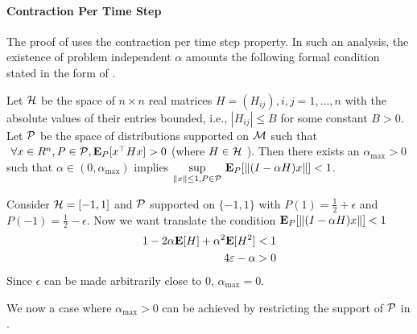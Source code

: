 \paragraph{Contraction Per Time Step}
The proof of  uses the contraction per time step property. In such an analysis, the existence of problem independent $\alpha$ amounts the following formal condition stated in the form of .
\begin{lemma}\label{steptheorem}
Let $\H$ be the space of $n\times n$ real matrices $H=(H_{ij}),i,j=1,\ldots,n$ with the absolute values of their entries bounded, i.e., $|H_{ij}|\leq B$ for some constant $B>0$. Let $\P$ be the space of distributions supported on $\M$ such that $~\forall x\in R^n, P\in \P,\E_{P}[x^\top H x] >0$ (where $H\in\H$ ). Then there exists an $\alpha_{\max}>0$ such that $\alpha\in(0,\alpha_{\max})$ implies $\us{\sup}{\norm{x}\leq 1,P\in\P}\E_{P}[\norm{(I-\alpha H)x}]< 1$.
\end{lemma}
\begin{example}
Consider $\H=[-1,1]$ and $\P$ supported on $\{-1,1\}$ with $P(1)=\frac{1}{2}+\epsilon$ and $P(-1)=\frac{1}{2}-\epsilon$. Now we want translate the condition $\E_{P}[\norm{(I-\alpha H)x}]<1$
\begin{align}
\begin{split}
1-2\alpha\E[H]+\alpha^2 \E[H^2]<1\\
4\epsilon-\alpha>0\\
\end{split}
\end{align}
Since $\epsilon$ can be made arbitrarily close to $0$, $\alpha_{\max}=0$.
\end{example}
We now a case where $\alpha_{\max}>0$  can be achieved by restricting the support of $\P$ in .
